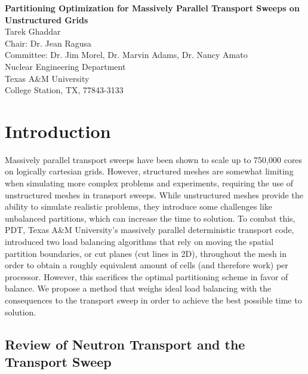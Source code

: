\documentclass[11pt, letterpaper,titlepage,oneside]{article}
\newcommand{\titles}{\LARGE \textbf{Partitioning Optimization for Massively Parallel Transport Sweeps on Unstructured Grids}}
\newcommand{\authors}{\normalsize Tarek Ghaddar \\ Chair: Dr. Jean Ragusa \\ Committee: Dr. Jim Morel, Dr. Marvin Adams, Dr. Nancy Amato}
\newcommand{\department}{\normalsize Nuclear Engineering Department}
\newcommand{\university}{\normalsize Texas A\&M University}
\newcommand{\locations}{\normalsize College Station, TX, 77843-3133}
\begin{document}

\begin{titlepage}
\begin{center}
  \vspace*{3.81 cm}
  \titles\\
  \vspace*{4.445cm}
  \authors \\
  \vspace*{2.54cm} 
  \department \\
  \university \\
  \locations \\
\end{center}
\end{titlepage}


\section{Introduction}
Massively parallel transport sweeps have been shown to scale up to 750,000 cores on logically cartesian grids. However, structured meshes are somewhat limiting when  simulating more complex problems and experiments, requiring the use of unstructured meshes in transport sweeps. While unstructured meshes provide the ability to simulate realistic problems, they introduce some challenges like unbalanced partitions, which can increase the time to solution. To combat this, PDT, Texas A\&M University's massively parallel deterministic transport code, introduced two load balancing algorithms that rely on moving the spatial partition boundaries, or cut planes (cut lines in 2D), throughout the mesh in order to obtain a roughly equivalent amount of cells (and therefore work) per processor. However, this sacrifices the optimal partitioning scheme\cite{mpadams2013} in favor of balance. We propose a method that weighs ideal load balancing with the consequences to the transport sweep in order to achieve the best possible time to solution.

\subsection{Review of Neutron Transport and the Transport Sweep}
\end{document}
